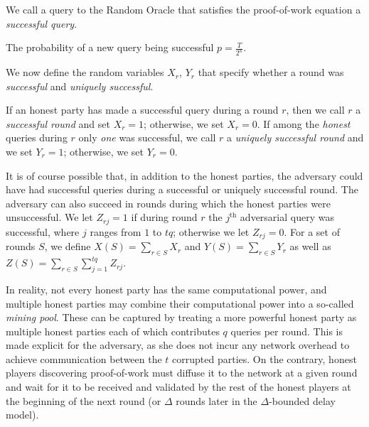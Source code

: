 \begin{definition}
We call a query to the Random Oracle that satisfies
the proof-of-work equation a \emph{successful query}.
\end{definition}

\begin{lemma}
The probability of a new query being successful $p = \frac{T}{2^\kappa}$.
\end{lemma}

We now define the random variables $X_r$, $Y_r$ that specify whether a round
was \emph{successful} and \emph{uniquely successful}.

\begin{definition}
If an honest party has made a successful query during a round $r$, then we call
$r$ a \emph{successful round} and set $X_r = 1$; otherwise, we set $X_r = 0$.
If among the \emph{honest} queries during $r$ only
\emph{one} was successful, we call $r$ a \emph{uniquely successful round}
and we set $Y_r = 1$; otherwise, we set $Y_r = 0$.
\end{definition}

It is of course possible that, in addition to the honest parties, the adversary
could have had successful queries during a successful or uniquely successful
round. The adversary can also succeed in rounds during which the honest parties
were unsuccessful. We let $Z_{rj} = 1$ if during round $r$ the $j^\text{th}$
adversarial query was successful, where $j$ ranges from $1$ to $tq$; otherwise
we let $Z_{rj} = 0$. For a set of rounds $S$, we define
$X(S) = \sum_{r \in S}X_r$ and $Y(S) = \sum_{r \in S}Y_r$ as well as
$Z(S) = \sum_{r \in S}\sum_{j = 1}^{tq} Z_{rj}$.

In reality, not every honest party has the same computational power, and
multiple honest parties may combine their computational power into a so-called
\emph{mining pool}. These can be captured by treating a more powerful honest
party as multiple honest parties each of which contributes $q$ queries per
round. This is made explicit for the adversary, as she does not incur any
network overhead to achieve communication between the $t$ corrupted parties. On
the contrary, honest players discovering proof-of-work must diffuse it to the
network at a given round and wait for it to be received and validated by the
rest of the honest players at the beginning of the next round (or $\Delta$
rounds later in the $\Delta$-bounded delay model).

